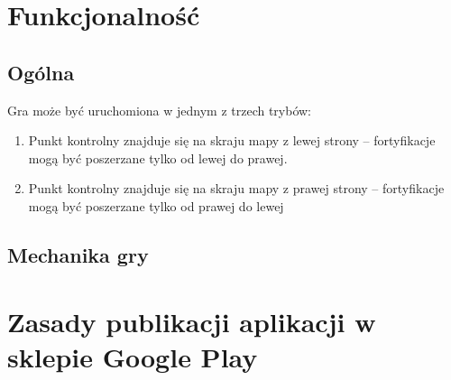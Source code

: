 \documentclass[12pt, a4paper]{article}
\begin{document}
\section{Funkcjonalność}

\subsection{Ogólna}
Gra może być uruchomiona w jednym z trzech trybów:
\begin{enumerate}
\item Punkt kontrolny znajduje się na skraju mapy z lewej strony -- fortyfikacje mogą być poszerzane tylko od lewej do prawej.
\item Punkt kontrolny znajduje się na skraju mapy z prawej strony -- fortyfikacje mogą być poszerzane tylko od prawej do lewej
\end{enumerate}

\subsection{Mechanika gry}

\section{Zasady publikacji aplikacji w sklepie Google Play}
\end{document}
